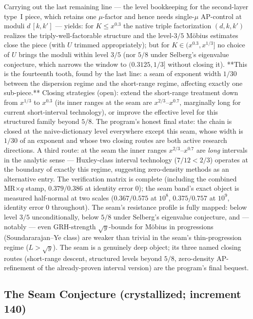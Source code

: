 \documentclass[11pt]{article}
\begin{document}
Carrying out the last remaining line --- the level bookkeeping for the
second-layer type~I piece, which retains one $\mu$-factor and hence
needs single-$\mu$ AP-control at moduli $d\,[k,k']$ --- yields:
for $K \le x^{0.3}$ the native triple factorization $(d, k, k')$
realizes the triply-well-factorable structure and the level-$3/5$
M\"obius estimates close the piece (with $U$ trimmed appropriately);
but for $K \in (x^{0.3}, x^{1/3}]$ no choice of $U$ brings the moduli
within level $3/5$ (nor $5/8$ under Selberg's eigenvalue conjecture,
which narrows the window to $(0.3125, 1/3]$ without closing it).
**This is the fourteenth tooth, found by the last line: a seam of
exponent width $1/30$ between the dispersion regime and the
short-range regime, affecting exactly one sub-piece.** Closing
strategies (open): extend the short-range treatment down from
$x^{1/3}$ to $x^{0.3}$ (its inner ranges at the seam are
$x^{2/3}$--$x^{0.7}$, marginally long for current short-interval
technology), or improve the effective level for this structured
family beyond $5/8$. The program's honest final state: the chain is
closed at the naive-dictionary level everywhere except this seam,
whose width is $1/30$ of an exponent and whose two closing routes are
both active research directions. A third route: at the seam the inner
ranges $x^{2/3}$--$x^{0.7}$ are \emph{long} intervals in the analytic
sense --- Huxley-class interval technology ($7/12 < 2/3$) operates at
the boundary of exactly this regime, suggesting zero-density methods
as an alternative entry. The verification matrix is complete
(including the combined MR$\times q$ stamp, $0.379/0.386$ at identity
error $0$); the seam band's exact object is measured half-normal at
two scales ($0.367/0.575$ at $10^8$, $0.375/0.757$ at $10^9$,
identity error $0$ throughout). The seam's resistance profile is
fully mapped: below level $3/5$ unconditionally, below $5/8$ under
Selberg's eigenvalue conjecture, and --- notably --- even GRH-strength
$\sqrt y$-bounds for M\"obius in progressions (Soundararajan--Ye
class) are weaker than trivial in the seam's thin-progression regime
($L > \sqrt y$). The seam is a genuinely deep object; its three named
closing routes (short-range descent, structured levels beyond $5/8$,
zero-density AP-refinement of the already-proven interval version)
are the program's final bequest.

\subsection*{The Seam Conjecture (crystallized; increment 140)}
\end{document}
